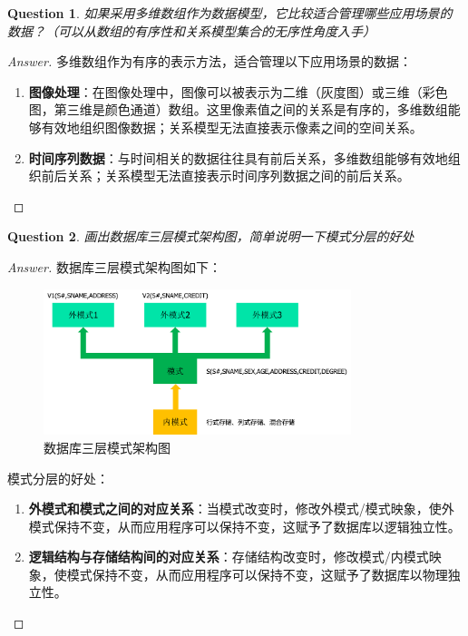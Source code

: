 \documentclass[UTF8,a4paper,10pt]{article}
\newtheorem{question}{Question}
\newenvironment{solution}
  {\begin{proof}[Answer]}
  {\end{proof}}
\begin{document}
	\begin{question}
	如果采用多维数组作为数据模型，它比较适合管理哪些应用场景的数据？（可以从数组的有序性和关系模型集合的无序性角度入手）
	\end{question}

	\begin{solution}
	多维数组作为有序的表示方法，适合管理以下应用场景的数据：

	\begin{enumerate}
		\item \textbf{图像处理}：在图像处理中，图像可以被表示为二维（灰度图）或三维（彩色图，第三维是颜色通道）数组。这里像素值之间的关系是有序的，多维数组能够有效地组织图像数据；关系模型无法直接表示像素之间的空间关系。
		\item \textbf{时间序列数据}：与时间相关的数据往往具有前后关系，多维数组能够有效地组织前后关系；关系模型无法直接表示时间序列数据之间的前后关系。
	\end{enumerate}

	\end{solution}

	
	\begin{question}
	画出数据库三层模式架构图，简单说明一下模式分层的好处
	\end{question}

	\begin{solution}
	数据库三层模式架构图如下：
	\begin{figure}[H]
		\centering
		\includegraphics[width=0.8\textwidth]{./fig/three-layer-architecture.png}
		\caption{数据库三层模式架构图}
	\end{figure}

	模式分层的好处：
	\begin{enumerate}
		\item \textbf{外模式和模式之间的对应关系}：当模式改变时，修改外模式/模式映象，使外模式保持不变，从而应用程序可以保持不变，这赋予了数据库以逻辑独立性。
		\item \textbf{逻辑结构与存储结构间的对应关系}：存储结构改变时，修改模式/内模式映象，使模式保持不变，从而应用程序可以保持不变，这赋予了数据库以物理独立性。
	\end{enumerate}

	\end{solution}
\end{document}

